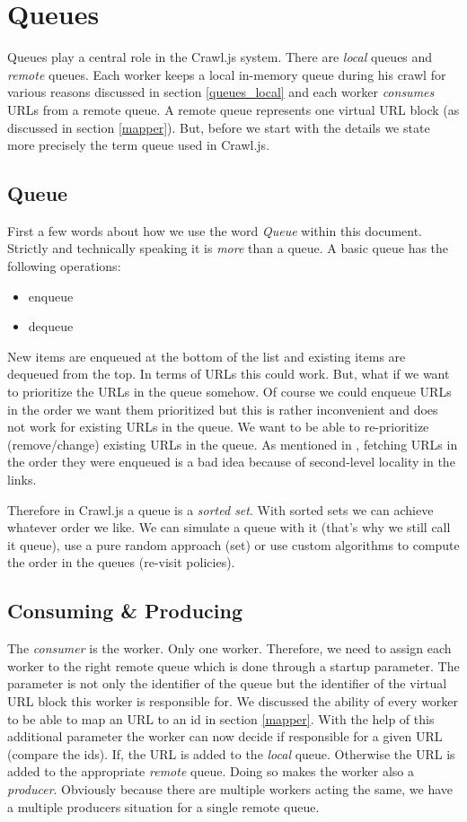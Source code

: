 \section{Queues}
Queues play a central role in the Crawl.js system. There are \emph{local} queues and \emph{remote} queues. Each worker keeps a local in-memory queue during his crawl for various reasons discussed in section \ref{queues_local} and each worker \emph{consumes} URLs from a remote queue. A remote queue represents one virtual URL block (as discussed in section \ref{mapper}). But, before we start with the details we state more precisely the term queue used in Crawl.js.

\subsection{Queue}
First a few words about how we use the word \emph{Queue} within this document. Strictly and technically speaking it is \emph{more} than a queue. A basic queue has the following operations:
\begin{itemize}
  \item enqueue
  \item dequeue
\end{itemize}

New items are enqueued at the bottom of the list and existing items are dequeued from the top. In terms of URLs this could work. But, what if we want to prioritize the URLs in the queue somehow. Of course we could enqueue URLs in the order we want them prioritized but this is rather inconvenient and does not work for existing URLs in the queue. We want to be able to re-prioritize (remove/change) existing URLs in the queue. As mentioned in \cite{hp_crawler}, fetching URLs in the order they were enqueued is a bad idea because of second-level locality in the links.

Therefore in Crawl.js a queue is a \emph{sorted set}. With sorted sets we can achieve whatever order we like. We can simulate a queue with it (that's why we still call it queue), use a pure random approach (set) or use custom algorithms to compute the order in the queues (re-visit policies).

\subsection{Consuming \& Producing}
The \emph{consumer} is the worker. Only one worker. Therefore, we need to assign each worker to the right remote queue which is done through a startup parameter. The parameter is not only the identifier of the queue but the identifier of the virtual URL block this worker is responsible for. We discussed the ability of every worker to be able to map an URL to an id in section \ref{mapper}. With the help of this additional parameter the worker can now decide if responsible for a given URL (compare the ids). If, the URL is added to the \emph{local} queue. Otherwise the URL is added to the appropriate \emph{remote} queue. Doing so makes the worker also a \emph{producer}. Obviously because there are multiple workers acting the same, we have a multiple producers situation for a single remote queue. 

